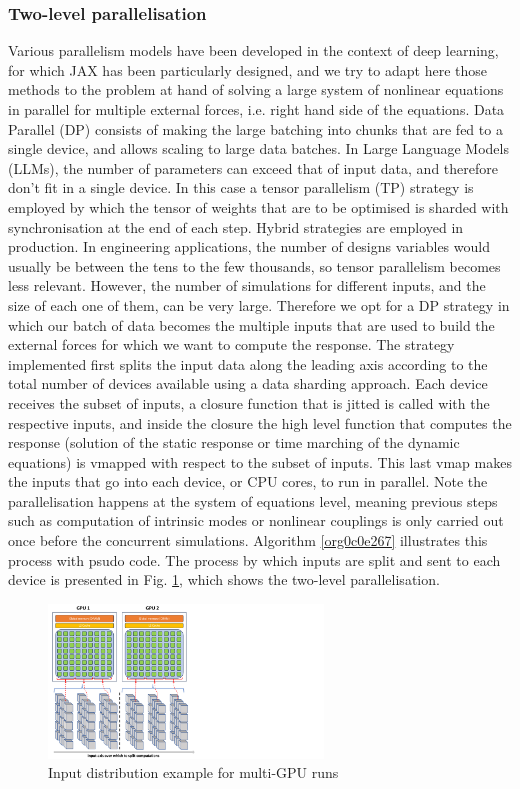 \documentclass[11pt]{article}
\begin{document}
\subsubsection{Two-level parallelisation}
\label{sec:org4a0d362}
Various parallelism models have been developed in the context of deep learning, for which JAX has been particularly designed, and we try to adapt here those methods to the problem at hand of solving a large system of nonlinear equations in parallel for multiple external forces, i.e. right hand side of the equations. Data Parallel (DP) consists of making the large batching into chunks that are fed to a single device, and allows scaling to large data batches. In Large Language Models (LLMs), the number of parameters can exceed that of input data, and therefore don't fit in a single device. In this case a tensor parallelism (TP) strategy is employed by which the tensor of weights that are to be optimised is sharded with synchronisation at the end of each step. Hybrid strategies are employed in production. In engineering applications, the number of designs variables would usually be between the tens to the few thousands, so tensor parallelism becomes less relevant. However, the number of simulations for different inputs, and the size of each one of them, can be very large. 
Therefore we opt for a DP strategy in which our batch of data becomes the multiple inputs that are used to build the external forces for which we want to compute the response.
The strategy implemented first splits the input data along the leading axis according to the total number of devices available using a data sharding approach. Each device receives the subset of inputs, a closure function that is jitted is called with the respective inputs, and inside the closure the high level function that computes the response (solution of the static response or time marching of the dynamic equations) is vmapped with respect to the subset of inputs. This last vmap makes the inputs that go into each device, or CPU cores, to run in parallel. Note the parallelisation happens at the system of equations level, meaning previous steps such as computation of intrinsic modes or nonlinear couplings is only carried out once before the concurrent simulations.
Algorithm \ref{org0c0e267} illustrates this process with psudo code.
The process by which inputs are split and sent to each device is presented in Fig. \ref{fig:org3578035}, which shows the two-level parallelisation.
\begin{figure}[!h]
\centering
\includegraphics[width=0.65\textwidth]{figs_ext/parallelGPU.pdf}
\caption{\label{fig:org3578035}Input distribution example for multi-GPU runs}
\end{figure}
\end{document}
